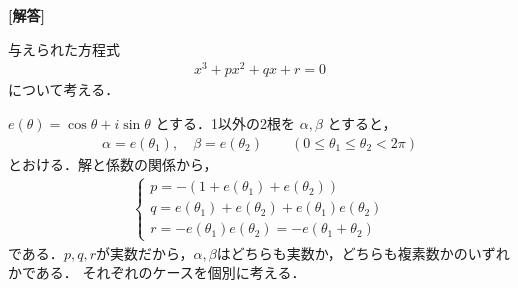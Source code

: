 \documentclass[../../main.tex]{subfiles}
\begin{document}
\begin{oframed}
  
\end{oframed}

{\bf [解答]}

与えられた方程式
\begin{align}
  x^3+px^2+qx+r = 0 \label{eq:1}
\end{align}
について考える．

$e(\theta) = \cos\theta + i\sin\theta$ とする．1以外の2根を $\alpha, \beta$ とすると，
\begin{align}
  \alpha = e(\theta_1), \quad \beta = e(\theta_2) \qquad (0 \le \theta_1 \le \theta_2 < 2\pi) \label{eq:2}
\end{align}
とおける．解と係数の関係から，
\begin{align}
  \begin{cases}
    p = -(1 + e(\theta_1) + e(\theta_2))  \\
    q = e(\theta_1) + e(\theta_2) + e(\theta_1)e(\theta_2) \\
    r = -e(\theta_1)e(\theta_2) = -e(\theta_1 + \theta_2)
  \end{cases} \label{eq:3}
\end{align}
である．$p,q,r$が実数だから，$\alpha,\beta$はどちらも実数か，どちらも複素数かのいずれかである．
それぞれのケースを個別に考える．
\end{document}
